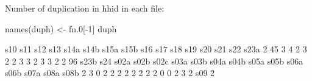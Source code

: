 Number of duplication in \textsf{hhid} in each file:
\begin{Schunk}
\begin{Sinput}
names(duph) <- fn.0[-1]
duph
\end{Sinput}
\begin{Soutput}
 s10  s11  s12  s13 s14a s14b s15a s15b  s16  s17  s18  s19  s20  s21  s22 s23a 
   2   45    3    4    2    3    2    2    3    3    2    3    3    2    2   96 
s23b  s24 s02a s02b s02c s03a s03b s04a s04b s05a s05b s06a s06b s07a s08a s08b 
   2    3    0    2    2    2    2    2    2    2    2    0    0    2    3    2 
 s09 
   2 
\end{Soutput}
\end{Schunk}


